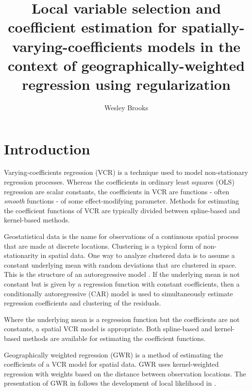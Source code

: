 \documentclass[authoryear, review, 11pt]{elsarticle}
\title{Local variable selection and coefficient estimation for spatially-varying-coefficients models in the context of geographically-weighted regression using regularization}
\author{Wesley Brooks}
\date{}                                           %
\begin{document}
\maketitle





\section{Introduction}
	Varying-coefficients regression (VCR) \citep{Hastie:1993a} is a technique used to model non-stationary regression processes. Whereas the coefficients in ordinary least squares (OLS) regression are scalar constants, the coefficients in VCR are functions - often \emph{smooth} functions - of some effect-modifying parameter.  Methods for estimating the coefficient functions of VCR are typically divided between spline-based \citep{Wood:2006} and kernel-based \citep{Hastie:1993b, Loader:1999} methods. 
	
	Geostatistical data is the name for observations of a continuous spatial process that are made at discrete locations. 
	Clustering is a typical form of non-stationarity in spatial data. One way to analyze clustered data is to assume a constant underlying mean with random deviations that are clustered in space. This is the structure of an autoregressive model \citep{}. If the underlying mean is not constant but is given by a regression function with constant coefficients, then a conditionally autoregressive (CAR) model \citep{} is used to simultaneously estimate regression coefficients and clustering of the residuals.

	Where the underlying mean is a regression function but the coefficients are not constants, a spatial VCR model is appropriate. Both spline-based \citep{} and kernel-based \citep{Fotheringham:2002} methods are available for estimating the coefficient functions. 
	
	Geographically weighted regression (GWR) \citep{Fotheringham:2002} is a method of estimating the coefficients of a VCR model for spatial data. GWR uses kernel-weighted regression with weights based on the distance between observation locations. The presentation of GWR in \cite{Fotheringham:2002} follows the development of local likelihood in \cite{Loader:1999}.
	
\end{document}
